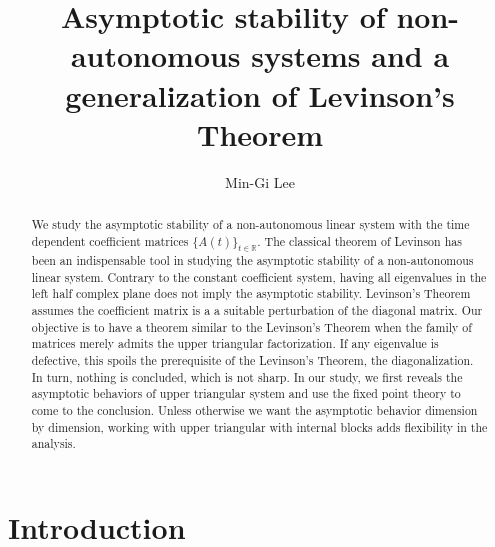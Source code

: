 \documentclass[a4paper,11pt]{article}
\newcounter{Theorem}
\theoremstyle{remark}
\begin{document}
\title{Asymptotic stability of non-autonomous systems and a generalization of Levinson's Theorem}
\author{Min-Gi Lee\footnotemark[1]}
\date{}

\maketitle
\renewcommand{\thefootnote}{\fnsymbol{footnote}}
\renewcommand{\thefootnote}{\arabic{footnote}}

 \begin{abstract}
We study the asymptotic stability of a non-autonomous linear system with the time dependent coefficient matrices $\{A(t)\}_{t\in \mathbb{R}}$. The classical theorem of Levinson has been an  indispensable tool in studying the asymptotic stability of a non-autonomous linear system. Contrary to the constant coefficient system, having all eigenvalues in the left half complex plane does not imply the asymptotic stability. Levinson's Theorem assumes the coefficient matrix is a  a suitable perturbation of the diagonal matrix. Our objective is to have a theorem similar to the Levinson's Theorem when the family of matrices merely admits the upper triangular factorization. If any eigenvalue is defective, this spoils the prerequisite of the Levinson's Theorem, the diagonalization. In turn, nothing is concluded, which is not sharp. In our study, we first reveals the asymptotic behaviors of upper triangular system and use the fixed point theory to come to the conclusion. Unless otherwise we want the asymptotic behavior dimension by dimension, working with upper triangular with internal blocks adds flexibility in the analysis.
 \end{abstract}



\vfil\eject


\section{Introduction}
\end{document}
